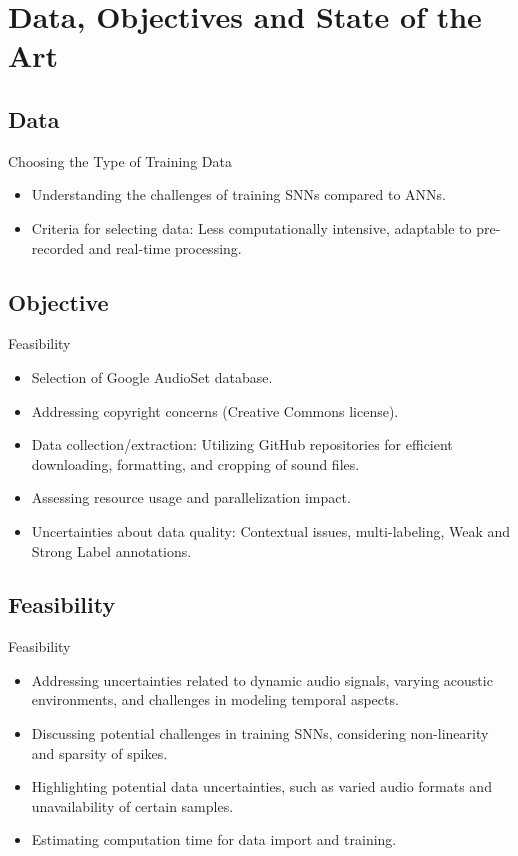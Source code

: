 \documentclass[aspectratio=169, 11pt]{beamer}
\begin{document}
\section{Data, Objectives and State of the Art}

\subsection{Data}

\begin{frame}{Choosing the Type of Training Data}
  \begin{itemize}
    \item Understanding the challenges of training SNNs compared to ANNs.
    \item Criteria for selecting data: Less computationally intensive, adaptable to pre-recorded and real-time processing.
  \end{itemize}
\end{frame}

\subsection{Objective}

\begin{frame}{Feasibility}
  \begin{itemize}
    \item Selection of Google AudioSet database.
    \item Addressing copyright concerns (Creative Commons license).
    \item Data collection/extraction: Utilizing GitHub repositories for efficient downloading, formatting, and cropping of sound files.
    \item Assessing resource usage and parallelization impact.
    \item Uncertainties about data quality: Contextual issues, multi-labeling, Weak and Strong Label annotations.
  \end{itemize}
\end{frame}



\subsection{Feasibility}

\begin{frame}{Feasibility}
  \begin{itemize}
    \item Addressing uncertainties related to dynamic audio signals, varying acoustic environments, and challenges in modeling temporal aspects.
    \item Discussing potential challenges in training SNNs, considering non-linearity and sparsity of spikes.
    \item Highlighting potential data uncertainties, such as varied audio formats and unavailability of certain samples.
    \item Estimating computation time for data import and training.
  \end{itemize}
\end{frame}
\end{document}
